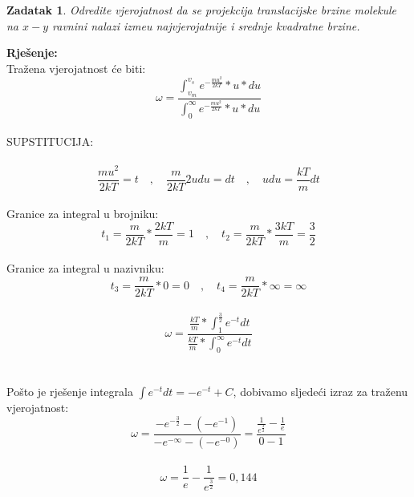 \documentclass[a4paper,12pt]{article}
\newtheorem{ZDK}{Zadatak}[section]
\begin{document}
\begin{ZDK}
	Odredite vjerojatnost da se projekcija translacijske brzine molekule na $x-y$ ravnini nalazi izme\dj u najvjerojatnije i srednje kvadratne brzine.
\end{ZDK}
\textbf{Rje\v{s}enje:} \\
\newline
Tra\v{z}ena vjerojatnost \'ce biti:
\\
$$ \omega=\frac{\int_{v_m}^{v_s}e^{-\frac{mu^2}{2kT}}*u*du}{\int_{0}^{\infty}e^{-\frac{mu^2}{2kT}}*u*du} $$
\\
SUPSTITUCIJA: \\
\\
$$ \frac{mu^2}{2kT}=t \quad,\quad \frac{m}{2kT}2udu=dt \quad,\quad udu=\frac{kT}{m}dt $$
\\
Granice za integral u brojniku: 
$$ t_1=\frac{m}{2kT}*\frac{2kT}{m}=1 \quad,\quad t_2=\frac{m}{2kT}*\frac{3kT}{m}=\frac{3}{2} $$
\\
Granice za integral u nazivniku:
$$ t_3=\frac{m}{2kT}*0=0 \quad,\quad t_4=\frac{m}{2kT}*\infty=\infty $$
\\
$$ \omega=\frac{\frac{kT}{m}*\int_{1}^{\frac{3}{2}}e^{-t}dt}{\frac{kT}{m}*\int_{0}^{\infty}e^{-t}dt} $$
\\
\\
Po\v{s}to je rje\v{s}enje integrala $\int e^{-t}dt=-e^{-t}+C$, dobivamo sljede\'ci izraz za tra\v{z}enu vjerojatnost:
\\
$$ \omega=\frac{-e^{-\frac{3}{2}}-(-e^{-1})}{-e^{-\infty}-(-e^{-0})}=\frac{\frac{1}{e^{\frac{3}{2}}}-\frac{1}{e}}{0-1} $$
\\
$$ \omega=\frac{1}{e}-\frac{1}{e^{\frac{3}{2}}}=0,144 $$
\end{document}
